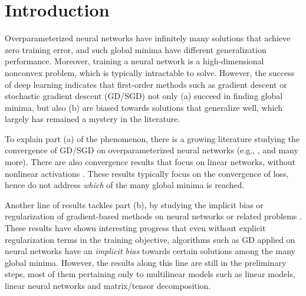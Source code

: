 \documentclass{article} %
\begin{document}
\begin{abstract}

\end{abstract}

\section{Introduction}
Overparameterized neural networks have infinitely many solutions that achieve zero training error, and such global minima have different generalization performance. Moreover, training a neural network is a high-dimensional nonconvex problem, which is typically intractable to solve.
However, the success of deep learning indicates that first-order methods such as gradient descent or stochastic gradient descent (GD/SGD) not only (a) succeed in finding global minima, but also (b) are biased towards solutions that generalize well, which largely has remained a mystery in the literature.

To explain part (a) of the phenomenon, there is a growing literature studying the convergence of GD/SGD on overparameterized neural networks (e.g., \citet{du2018gradientB, du2018gradientA, allen2018convergence, zou2018stochastic,jacot2018neural,oymak2020towards}, and many more). 
There are also convergence results that focus on linear networks, without nonlinear activations \citep{bartlett2018gradient,arora2019convergence,wu2019global,du2019width,hu2020provable}.
These results typically focus on the convergence of loss, hence do not address \emph{which} of the many global minima is reached.

Another line of results tackles part (b), by studying the implicit bias or regularization of gradient-based methods on neural networks or related problems \citep{gunasekar2017implicit,gunasekar2018characterizing,gunasekar2018implicit,arora2018optimization,soudry2018implicit,ji2019gradient,arora2019implicit,woodworth2020kernel,chizat2020implicit,gissin2020implicit}. These results have shown interesting progress that even without explicit regularization terms in the training objective, algorithms such as GD applied on neural networks have an \emph{implicit bias} towards certain solutions among the many global minima. 
However, the results along this line are still in the preliminary steps, most of them pertaining only to multilinear models such as linear models, linear neural networks and matrix/tensor decomposition.
\end{document}
